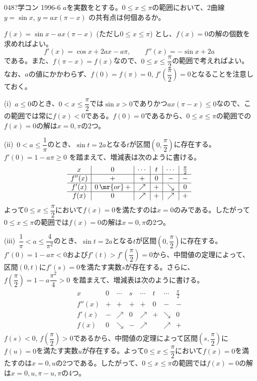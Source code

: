 
\begin{prob}{048}{\hosi ?}{学コン 1996-6}
 $a$を実数をとする。$0\le x \le \pi$の範囲において、2曲線 $y=\sin x$, $y=ax(\pi-x)$ の共有点は何個あるか。
\end{prob}

$f(x)=\sin x -ax(\pi-x)$ (ただし$0\le x\le \pi$) とし、$f(x)=0$の解の個数を求めればよい。
\[ f'(x)=\cos x+2ax-a\pi, \qquad f''(x)=-\sin x + 2a \]
である。また、$f(\pi-x)=f(x)$なので、$0\le x\le \dfrac{\pi}{2}$の範囲で考えればよい。なお、$a$の値にかかわらず、$f(0)=f(\pi)=0$, $f'\left(\dfrac{\pi}{2}\right)=0$となることを注意しておく。

(i)~$a\le 0$のとき、$0< x\le \dfrac{\pi}{2}$では$\sin x>0$でありかつ$ax(\pi-x)\le 0$なので、この範囲では常に$f(x)<0$である。$f(0)=0$であるから、$0\le x\le \pi$の範囲での$f(x)=0$の解は$x=0, \pi$の2つ。

(ii)~$0<a\le\dfrac{1}{\pi}$のとき、$\sin t=2a$となる$t$が区間$\left(0, \dfrac{\pi}{2} \right)$に存在する。$f'(0)=1-a\pi\ge 0$ を踏まえて、増減表は次のように書ける。
\begin{align*}
 \begin{array}{c|c|c|c|c|c}
  x & 0 & \cdots & t & \cdots & \frac{\pi}{2} \\ \hline
  f''(x) & + & + & 0 & - & - \\ \hline
  f'(x) & 0 \,\mr{or}\, + & \nearrow & + & \searrow & 0 \\ \hline
  f(x) & 0 & \nearrow & + & \nearrow & + 
 \end{array}
\end{align*}
よって$0\le x\le \dfrac{\pi}{2}$において$f(x)=0$を満たすのは$x=0$のみである。したがって$0\le x\le \pi$の範囲では$f(x)=0$の解は$x=0, \pi$の2つ。

(iii)~$\dfrac{1}{\pi}<a\le\dfrac{4}{\pi^2}$のとき、$\sin t=2a$となる$t$が区間$\left(0, \dfrac{\pi}{2} \right)$に存在する。$f'(0)=1-a\pi< 0$および$f'(t)>f'\left(\dfrac{\pi}{2}\right)=0$から、中間値の定理によって、区間$(0,t)$に$f'(s)=0$を満たす実数$s$が存在する。さらに、$f\left(\dfrac{\pi}{2}\right)=1-a\dfrac{\pi^2}{4}>0$ を踏まえて、増減表は次のように書ける。
\begin{align*}
 \begin{array}{c|c|c|c|c|c|c|c}
  x & 0 & \cdots & s & \cdots & t & \cdots & \frac{\pi}{2} \\ \hline
  f''(x) & + & + & + & + & 0 & - & - \\ \hline
  f'(x) & - & \nearrow & 0 & \nearrow &  + & \searrow & 0 \\ \hline
  f(x) & 0 & \searrow & - & \nearrow & & \nearrow & +
 \end{array}
\end{align*}
$f(s)<0$, $f\left(\dfrac{\pi}{2}\right)>0$であるから、中間値の定理によって区間$\left(s, \dfrac{\pi}{2}\right)$に$f(u)=0$を満たす実数$u$が存在する。よって$0\le x\le\dfrac{\pi}{2}$において$f(x)=0$を満たすのは$x=0, u$の2つである。したがって、$0\le x\le \pi$の範囲では$f(x)=0$の解は$x=0, u, \pi-u, \pi$の4つ。


